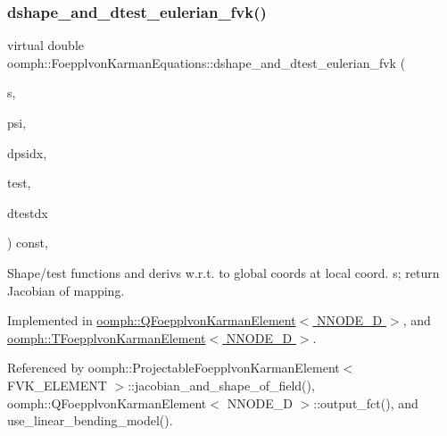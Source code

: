\mbox{\label{classoomph_1_1FoepplvonKarmanEquations_a59a391262fa8c5ae6313db65cf682ee2}} 
\subsubsection{\texorpdfstring{dshape\+\_\+and\+\_\+dtest\+\_\+eulerian\+\_\+fvk()}{dshape\_and\_dtest\_eulerian\_fvk()}}
{\footnotesize\ttfamily virtual double oomph\+::\+Foepplvon\+Karman\+Equations\+::dshape\+\_\+and\+\_\+dtest\+\_\+eulerian\+\_\+fvk (\begin{DoxyParamCaption}\item[{const \hyperlink{classoomph_1_1Vector}{Vector}$<$ double $>$ \&}]{s,  }\item[{\hyperlink{classoomph_1_1Shape}{Shape} \&}]{psi,  }\item[{\hyperlink{classoomph_1_1DShape}{D\+Shape} \&}]{dpsidx,  }\item[{\hyperlink{classoomph_1_1Shape}{Shape} \&}]{test,  }\item[{\hyperlink{classoomph_1_1DShape}{D\+Shape} \&}]{dtestdx }\end{DoxyParamCaption}) const\hspace{0.3cm}{\ttfamily [protected]}, {}}



Shape/test functions and derivs w.\+r.\+t. to global coords at local coord. s; return Jacobian of mapping. 



Implemented in \hyperlink{classoomph_1_1QFoepplvonKarmanElement_a076f4b10ddea48722747f52e33497a8d}{oomph\+::\+Q\+Foepplvon\+Karman\+Element$<$ N\+N\+O\+D\+E\+\_\+D $>$}, and \hyperlink{classoomph_1_1TFoepplvonKarmanElement_aee55fcd80bf4f6ea2550a43216e8e1c0}{oomph\+::\+T\+Foepplvon\+Karman\+Element$<$ N\+N\+O\+D\+E\+\_\+D $>$}.



Referenced by oomph\+::\+Projectable\+Foepplvon\+Karman\+Element$<$ F\+V\+K\+\_\+\+E\+L\+E\+M\+E\+N\+T $>$\+::jacobian\+\_\+and\+\_\+shape\+\_\+of\+\_\+field(), oomph\+::\+Q\+Foepplvon\+Karman\+Element$<$ N\+N\+O\+D\+E\+\_\+D $>$\+::output\+\_\+fct(), and use\+\_\+linear\+\_\+bending\+\_\+model().

